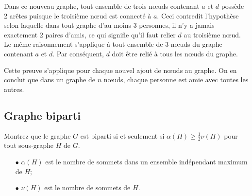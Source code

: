 \begin{solution}
Dans ce nouveau graphe, tout ensemble de trois nœuds contenant $a$ et $d$ possède 2 arêtes puisque le troisième nœud est connecté à $a$. Ceci contredit l'hypothèse selon laquelle dans tout graphe d'au moins 3 personnes, il n'y a jamais exactement 2 paires d'amis, ce qui signifie qu'il faut relier $d$ au troisième nœud. Le même raisonnement s'applique à tout ensemble de 3 nœuds du graphe contenant $a$ et $d$. Par conséquent, $d$ doit être relié à tous les nœuds du graphe.

\begin{center}
\end{center}

Cette preuve s'applique pour chaque nouvel ajout de nœuds au graphe. On en conclut que dans un graphe de $n$ nœuds, chaque personne est amie avec toutes les autres.
\end{solution}

\subsection{Graphe biparti}
Montrez que le graphe $G$ est biparti si et seulement si $\alpha(H) \geq \frac{1}{2} \nu(H)$ pour tout sous-graphe $H$ de $G$.

\begin{enumerate}
  \item[$\bullet$] $\alpha(H)$ est le nombre de sommets dans un ensemble indépendant maximum de $H$;
  \item[$\bullet$] $\nu(H)$ est le nombre de sommets de $H$.
\end{enumerate}

